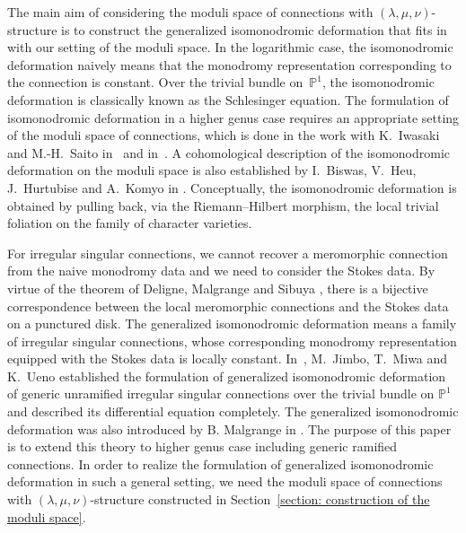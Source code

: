 \documentclass[pdftex]{sigma}
\numberwithin{equation}{section}
\begin{document}
The main aim of considering the moduli space of connections with $(\lambda,\mu,\nu)$-structure
is to construct the generalized isomonodromic deformation
that fits in with our setting of the moduli space.
In the logarithmic case, the isomonodromic deformation naively means that
the monodromy representation corresponding to the connection is constant.
Over the trivial bundle on~$\mathbb{P}^1$,
the isomonodromic deformation is classically known as the Schlesinger equation.
The formulation of isomonodromic deformation in a higher genus case requires
an appropriate setting of the moduli space of connections, which is done
in the work with K.~Iwasaki and M.-H.~Saito in~\cite{IIS-1} and in~\cite{Inaba-1}.
A cohomological description of the isomonodromic deformation on the moduli space
is also established by I.~Biswas, V.~Heu, J.~Hurtubise and A.~Komyo
in \cite{Biswas-Heu-Hurtubise-1, Biswas-Heu-Hurtubise-2,Komyo-1}.
Conceptually, the isomonodromic deformation is obtained by
pulling back, via the Riemann--Hilbert morphism,
the local trivial foliation on the family of character varieties.

For irregular singular connections, we cannot recover a meromorphic connection
from the naive monodromy data and we need to consider the Stokes data.
By virtue of the theorem of Deligne, Malgrange and Sibuya
\cite[Theorems~4.5.1 and 4.7.3]{Babbitt-Varadarajan},
there is a bijective correspondence between the local meromorphic connections
and the Stokes data on a punctured disk.
The generalized isomonodromic deformation means a family of irregular singular connections,
whose corresponding monodromy representation equipped with the Stokes data
is locally constant.
In~\cite{Jimbo-Miwa-Ueno},
M.~Jimbo, T.~Miwa and K.~Ueno established
the formulation of generalized isomonodromic deformation of
generic unramified irregular singular connections over the trivial bundle on $\mathbb{P}^1$
and described its differential equation completely.
The generalized isomonodromic deformation was also introduced by B. Malgrange
in \cite{Malgrange}.
The purpose of this paper is to extend this theory to higher genus case
including generic ramified connections.
In order to realize the formulation of generalized isomonodromic deformation in such a general setting,
we need the moduli space of connections
with $(\lambda,\mu,\nu)$-structure constructed
in Section~\ref{section: construction of the moduli space}.
\end{document}
